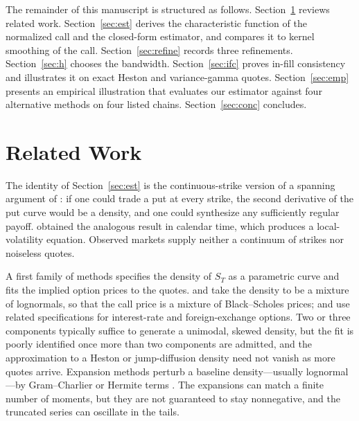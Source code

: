 \documentclass[preprint,12pt,authoryear,times]{elsarticle}
\begin{document}
The remainder of this manuscript is structured as follows. Section~\ref{sec:lit} reviews related work. Section~\ref{sec:est} derives the characteristic function of the normalized call and the closed-form estimator, and compares it to kernel smoothing of the call. Section~\ref{sec:refine} records three refinements. Section~\ref{sec:h} chooses the bandwidth. Section~\ref{sec:ifc} proves in-fill consistency and illustrates it on exact Heston and variance-gamma quotes. Section~\ref{sec:emp} presents an empirical illustration that evaluates our estimator against four alternative methods on four listed chains. Section~\ref{sec:conc} concludes.

\section{Related Work}
\label{sec:lit}

The identity of Section~\ref{sec:est} is the continuous-strike version of a spanning argument of \citet{ross1976}: if one could trade a put at every strike, the second derivative of the put curve would be a density, and one could synthesize any sufficiently regular payoff. \citet{dupire1994} obtained the analogous result in calendar time, which produces a local-volatility equation. Observed markets supply neither a continuum of strikes nor noiseless quotes.

A first family of methods specifies the density of \(S_T\) as a parametric curve and fits the implied option prices to the quotes. \citet{ritchey1990} and \citet{melick1997} take the density to be a mixture of lognormals, so that the call price is a mixture of Black--Scholes prices; \citet{bahra1997} and \citet{soderlind1997} use related specifications for interest-rate and foreign-exchange options. Two or three components typically suffice to generate a unimodal, skewed density, but the fit is poorly identified once more than two components are admitted, and the approximation to a Heston or jump-diffusion density need not vanish as more quotes arrive. Expansion methods perturb a baseline density---usually lognormal---by Gram--Charlier or Hermite terms \citep{jarrowrudd1982,corradosu1996,rompolis2007,xiu2014}. The expansions can match a finite number of moments, but they are not guaranteed to stay nonnegative, and the truncated series can oscillate in the tails.
\end{document}

